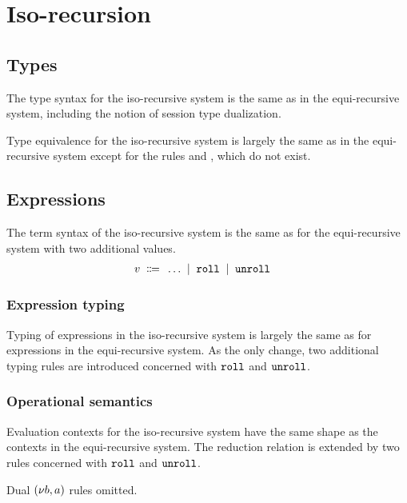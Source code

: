 \section{Iso-recursion}

\subsection{Types}

The type syntax for the iso-recursive system is the same as in the
equi-recursive system, including the notion of session type dualization.

Type equivalence for the iso-recursive system is largely the same as in the
equi-recursive system except for the rules \textsc{\EqUnrollL} and
\textsc{\EqUnrollR}, which do not exist.


\subsection{Expressions}

The term syntax of the iso-recursive system is the same as for the
equi-recursive system with two additional values.
\begin{align*}
  v \grmdef& \dots \grmor \EkwRoll \grmor \EkwUnroll
\end{align*}


\subsubsection{Expression typing}

Typing of expressions in the iso-recursive system is largely the same as for
expressions in the equi-recursive system. As the only change, two additional
typing rules are introduced concerned with $\EkwRoll$ and $\EkwUnroll$.
\begin{mathpar}

\end{mathpar}


\subsubsection{Operational semantics}

Evaluation contexts for the iso-recursive system have the same shape as the
contexts in the equi-recursive system. The reduction relation is extended by
two rules concerned with $\EkwRoll$ and $\EkwUnroll$.
\begin{mathpar}

\end{mathpar}
Dual $\PScope[b,a]$ rules omitted.

